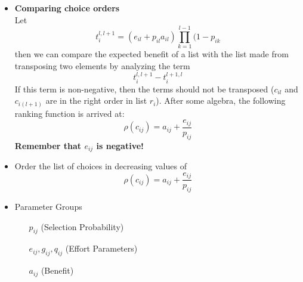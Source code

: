 \documentclass{article}
\begin{document}
\begin{itemize}
\item {\bf Comparing choice orders} \\
    Let \[ t_i^{l,l+1} = 
        (e_{il} + p_{il}a_{il})\prod_{k=1}^{l-1}(1-p_{ik} \]
    then we can compare the expected benefit of a list with the list made from transposing two elements by analyzing the term
        \[ t_i^{l,l+1} - t_i^{l+1,l} \]
    If this term is non-negative, then the terms should not be transposed ($c_{il}$ and $c_{i(l+1)}$ are in the right order in list $r_i$).  After some algebra, the following ranking function is arrived at:
        \[ \rho(c_{ij}) = a_{ij} + \frac{e_{ij}}{p_{ij}} \]
    {\bf Remember that $e_{ij}$ is negative!}

\item {}

    Order the list of choices in decreasing values of 
    \[ \rho(c_{ij}) = a_{ij} + \frac{e_{ij}}{p_{ij}} \]

\item Parameter Groups
    \begin{enumerate}
        \item[$p_{ij}$](Selection Probability) \\
        \item[$e_{ij}, g_{ij}, q_{ij}$](Effort Parameters) \\
        \item[$a_{ij}$](Benefit) \\
    \end{enumerate}

\end{itemize}

\end{document}
